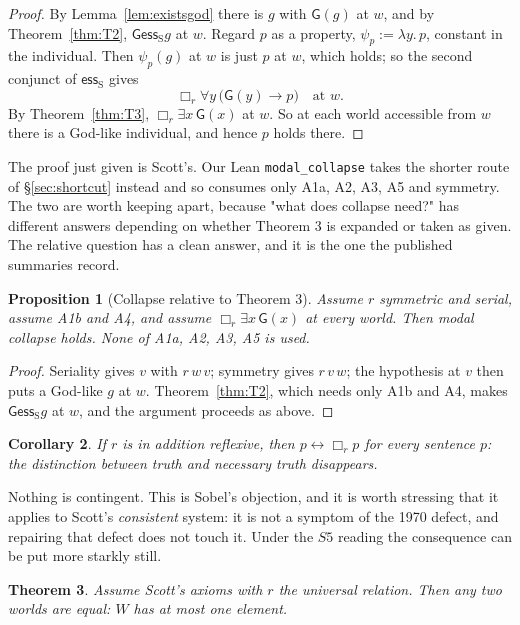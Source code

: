 \documentclass[11pt]{article}
\theoremstyle{plain}
\newtheorem{theorem}{Theorem}
\newtheorem{proposition}[theorem]{Proposition}
\newtheorem{corollary}[theorem]{Corollary}
\theoremstyle{definition}
\newcommand{\esss}{\mathrel{\mathsf{ess}_{\mathrm{S}}}}
\newcommand{\Gd}{\mathsf{G}}
\begin{document}
\begin{proof}
By Lemma~\ref{lem:existsgod} there is $g$ with $\Gd(g)$ at $w$, and by
Theorem~\ref{thm:T2}, $\Gd \esss g$ at $w$. Regard $p$ as a property,
$\psi_p := \lambda y.\, p$, constant in the individual. Then $\psi_p(g)$ at $w$
is just $p$ at $w$, which holds; so the second conjunct of $\esss$ gives
\[
  \Box_r \forall y\,\bigl(\Gd(y) \to p\bigr) \quad\text{at } w .
\]
By Theorem~\ref{thm:T3}, $\Box_r \exists x\,\Gd(x)$ at $w$. So at each world
accessible from $w$ there is a God-like individual, and hence $p$ holds there.
\end{proof}

\noindent
The proof just given is Scott's. Our Lean \verb|modal_collapse| takes the
shorter route of \S\ref{sec:shortcut} instead and so consumes only A1a, A2, A3,
A5 and symmetry. The two are worth keeping apart, because "what does collapse
need?" has different answers depending on whether Theorem 3 is expanded or
taken as given. The relative question has a clean answer, and it is the one the
published summaries record.

\begin{proposition}[Collapse relative to Theorem 3]\label{thm:mcrel}
Assume $r$ symmetric and serial, assume A1b and A4, and assume
$\Box_r \exists x\,\Gd(x)$ at every world. Then modal collapse holds. None of
A1a, A2, A3, A5 is used.
\end{proposition}

\begin{proof}
Seriality gives $v$ with $r\,w\,v$; symmetry gives $r\,v\,w$; the hypothesis at
$v$ then puts a God-like $g$ at $w$. Theorem~\ref{thm:T2}, which needs only A1b
and A4, makes $\Gd \esss g$ at $w$, and the argument proceeds as above.
\end{proof}

\begin{corollary}
If $r$ is in addition reflexive, then $p \leftrightarrow \Box_r p$ for every
sentence $p$: the distinction between truth and necessary truth disappears.
\end{corollary}

Nothing is contingent. This is Sobel's objection, and it is worth stressing
that it applies to Scott's \emph{consistent} system: it is not a symptom of the
1970 defect, and repairing that defect does not touch it. Under the $S5$
reading the consequence can be put more starkly still.

\begin{theorem}\label{thm:oneworld}
Assume Scott's axioms with $r$ the universal relation. Then any two worlds are
equal: $W$ has at most one element.
\end{theorem}
\end{document}

